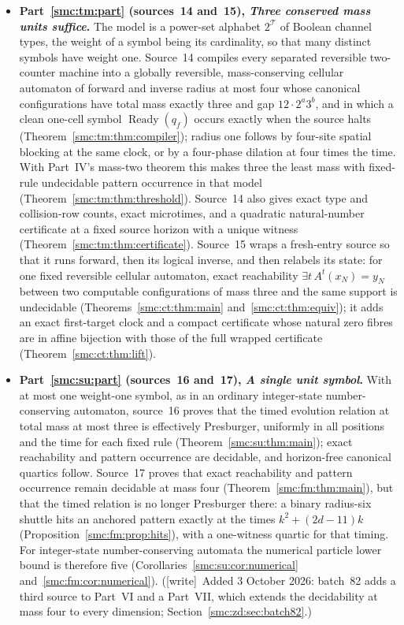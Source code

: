 \documentclass[11pt,letterpaper]{article}
\numberwithin{equation}{section}
\theoremstyle{definition}
\theoremstyle{remark}
\newcommand{\wtag}{\textup{[write]}}
\newcommand{\Ready}{\operatorname{Ready}}
\begin{document}
\begin{itemize}
\item \textbf{Part~\ref{smc:tm:part} (sources~14 and~15), \emph{Three conserved mass units suffice}.} The model is a power-set alphabet $2^{\mathcal T}$ of Boolean channel types, the weight of a symbol being its cardinality, so that many distinct symbols have weight one. Source~14 compiles every separated reversible two-counter machine into a globally reversible, mass-conserving cellular automaton of forward and inverse radius at most four whose canonical configurations have total mass exactly three and gap $12\cdot2^a3^b$, and in which a clean one-cell symbol $\Ready(q_f)$ occurs exactly when the source halts (Theorem~\ref{smc:tm:thm:compiler}); radius one follows by four-site spatial blocking at the same clock, or by a four-phase dilation at four times the time. With Part~IV's mass-two theorem this makes three the least mass with fixed-rule undecidable pattern occurrence in that model (Theorem~\ref{smc:tm:thm:threshold}). Source~14 also gives exact type and collision-row counts, exact microtimes, and a quadratic natural-number certificate at a fixed source horizon with a unique witness (Theorem~\ref{smc:tm:thm:certificate}). Source~15 wraps a fresh-entry source so that it runs forward, then its logical inverse, and then relabels its state: for one fixed reversible cellular automaton, exact reachability $\exists t\,A^t(x_N)=y_N$ between two computable configurations of mass three and the same support is undecidable (Theorems~\ref{smc:ct:thm:main} and~\ref{smc:ct:thm:equiv}); it adds an exact first-target clock and a compact certificate whose natural zero fibres are in affine bijection with those of the full wrapped certificate (Theorem~\ref{smc:ct:thm:lift}).
\item \textbf{Part~\ref{smc:su:part} (sources~16 and~17), \emph{A single unit symbol}.} With at most one weight-one symbol, as in an ordinary integer-state number-conserving automaton, source~16 proves that the timed evolution relation at total mass at most three is effectively Presburger, uniformly in all positions and the time for each fixed rule (Theorem~\ref{smc:su:thm:main}); exact reachability and pattern occurrence are decidable, and horizon-free canonical quartics follow. Source~17 proves that exact reachability and pattern occurrence remain decidable at mass four (Theorem~\ref{smc:fm:thm:main}), but that the timed relation is no longer Presburger there: a binary radius-six shuttle hits an anchored pattern exactly at the times $k^2+(2d-11)k$ (Proposition~\ref{smc:fm:prop:hits}), with a one-witness quartic for that timing. For integer-state number-conserving automata the numerical particle lower bound is therefore five (Corollaries~\ref{smc:su:cor:numerical} and~\ref{smc:fm:cor:numerical}). (\wtag\ Added 3 October 2026: batch~82 adds a third source to Part~VI and a Part~VII, which extends the decidability at mass four to every dimension; Section~\ref{smc:zd:sec:batch82}.)
\end{itemize}
\end{document}
